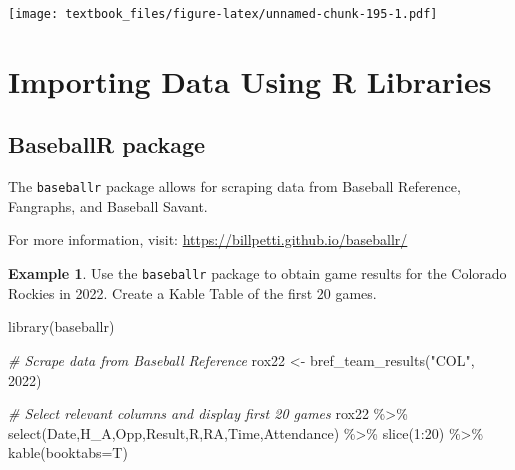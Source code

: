 \documentclass[
  11pt,
]{book}
\newenvironment{Shaded}{\begin{snugshade}}{\end{snugshade}}
\newcommand{\AttributeTok}[1]{\textcolor[rgb]{0.77,0.63,0.00}{#1}}
\newcommand{\CommentTok}[1]{\textcolor[rgb]{0.56,0.35,0.01}{\textit{#1}}}
\newcommand{\DecValTok}[1]{\textcolor[rgb]{0.00,0.00,0.81}{#1}}
\newcommand{\FunctionTok}[1]{\textcolor[rgb]{0.00,0.00,0.00}{#1}}
\newcommand{\NormalTok}[1]{#1}
\newcommand{\OtherTok}[1]{\textcolor[rgb]{0.56,0.35,0.01}{#1}}
\newcommand{\SpecialCharTok}[1]{\textcolor[rgb]{0.00,0.00,0.00}{#1}}
\newcommand{\StringTok}[1]{\textcolor[rgb]{0.31,0.60,0.02}{#1}}
\theoremstyle{definition}
\theoremstyle{definition}
\newtheorem{example}{Example}[chapter]
\theoremstyle{definition}
\theoremstyle{definition}
\theoremstyle{remark}
\begin{document}
\texttt{[image: textbook\_files/figure-latex/unnamed-chunk-195-1.pdf]}

\newpage

\hypertarget{importing-data-using-r-libraries}{%
\section{Importing Data Using R Libraries}\label{importing-data-using-r-libraries}}

\hypertarget{baseballr-package}{%
\subsection{BaseballR package}\label{baseballr-package}}

The \texttt{baseballr} package allows for scraping data from Baseball Reference, Fangraphs, and Baseball Savant.

For more information, visit: \url{https://billpetti.github.io/baseballr/}

\begin{example}
Use the \texttt{baseballr} package to obtain game results for the Colorado Rockies in 2022. Create a Kable Table of the first 20 games.
\end{example}

\begin{Shaded}
\begin{Highlighting}[]
\FunctionTok{library}\NormalTok{(baseballr)}

\CommentTok{\# Scrape data from Baseball Reference}
\NormalTok{rox22 }\OtherTok{\textless{}{-}} \FunctionTok{bref\_team\_results}\NormalTok{(}\StringTok{"COL"}\NormalTok{, }\DecValTok{2022}\NormalTok{)}

\CommentTok{\# Select relevant columns and display first 20 games}
\NormalTok{rox22 }\SpecialCharTok{\%\textgreater{}\%} 
  \FunctionTok{select}\NormalTok{(Date,H\_A,Opp,Result,R,RA,Time,Attendance) }\SpecialCharTok{\%\textgreater{}\%} 
  \FunctionTok{slice}\NormalTok{(}\DecValTok{1}\SpecialCharTok{:}\DecValTok{20}\NormalTok{) }\SpecialCharTok{\%\textgreater{}\%} \FunctionTok{kable}\NormalTok{(}\AttributeTok{booktabs=}\NormalTok{T)}
\end{Highlighting}
\end{Shaded}
\end{document}
